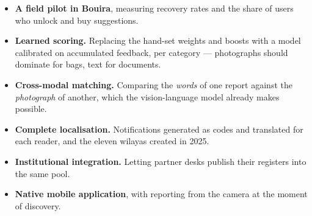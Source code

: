 \begin{itemize}[leftmargin=1.4em,itemsep=3pt]
  \item \textbf{A field pilot in Bouira}, measuring recovery rates and the
        share of users who unlock and buy suggestions.
  \item \textbf{Learned scoring.} Replacing the hand-set weights and boosts with
        a model calibrated on accumulated feedback, per category --- photographs
        should dominate for bags, text for documents.
  \item \textbf{Cross-modal matching.} Comparing the \emph{words} of one report
        against the \emph{photograph} of another, which the vision-language
        model already makes possible.
  \item \textbf{Complete localisation.} Notifications generated as codes and
        translated for each reader, and the eleven wilayas created in 2025.
  \item \textbf{Institutional integration.} Letting partner desks publish their
        registers into the same pool.
  \item \textbf{Native mobile application}, with reporting from the camera at
        the moment of discovery.
\end{itemize}


